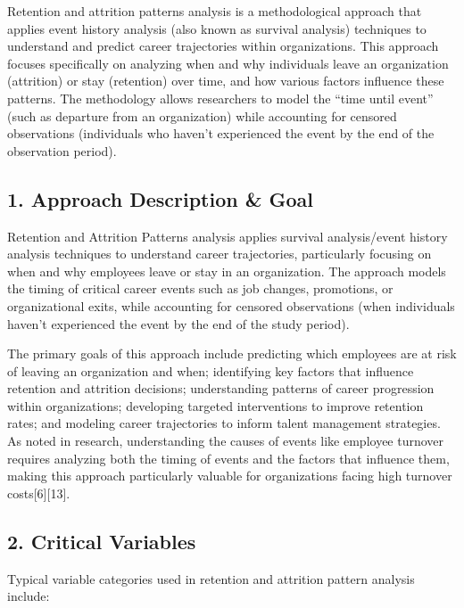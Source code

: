 \documentclass[./main.tex]{subfiles}
\begin{document}
Retention and attrition patterns analysis is a methodological approach
that applies event history analysis (also known as survival analysis)
techniques to understand and predict career trajectories within
organizations. This approach focuses specifically on analyzing when and
why individuals leave an organization (attrition) or stay (retention)
over time, and how various factors influence these patterns. The
methodology allows researchers to model the ``time until event'' (such
as departure from an organization) while accounting for censored
observations (individuals who haven't experienced the event by the end
of the observation period).

\subsection{1. Approach Description \&
Goal}\label{approach-description-goal}

Retention and Attrition Patterns analysis applies survival
analysis/event history analysis techniques to understand career
trajectories, particularly focusing on when and why employees leave or
stay in an organization. The approach models the timing of critical
career events such as job changes, promotions, or organizational exits,
while accounting for censored observations (when individuals haven't
experienced the event by the end of the study period).

The primary goals of this approach include predicting which employees
are at risk of leaving an organization and when; identifying key factors
that influence retention and attrition decisions; understanding patterns
of career progression within organizations; developing targeted
interventions to improve retention rates; and modeling career
trajectories to inform talent management strategies. As noted in
research, understanding the causes of events like employee turnover
requires analyzing both the timing of events and the factors that
influence them, making this approach particularly valuable for
organizations facing high turnover costs{[}6{]}{[}13{]}.

\subsection{2. Critical Variables}\label{critical-variables}

Typical variable categories used in retention and attrition pattern
analysis include:
\end{document}
